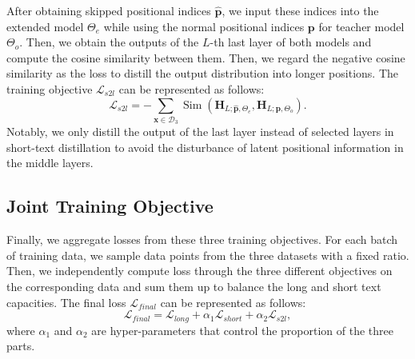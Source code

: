 After obtaining skipped positional indices $\hat{\bm {p}}$, we input these indices into the extended model $\Theta_e$ while using the normal positional indices $\bm p$ for teacher model $\Theta_o$. Then, we obtain the outputs of the $L$-th last layer of both models and compute the cosine similarity between them. Then, we regard the negative cosine similarity as the loss to distill the output distribution into longer positions. 
The training objective $\mathcal{L}_{s2l}$ can be represented as follows:
\begin{equation}
    \mathcal{L}_{s2l} = -\sum_{\bm{x}\in \mathcal D_3}  \operatorname{Sim}( \mathbf H_{L; \hat{\bm{p}}, \Theta_{e}}, \mathbf H_{L; \bm p,\Theta_{o}}).
\end{equation}
Notably, we only distill the output of the last layer instead of selected layers in short-text distillation to avoid the disturbance of latent positional information in the middle layers. 

\subsection{Joint Training Objective}

Finally,  we aggregate losses from these three training objectives. For each batch of training data, we sample data points from the three datasets with a fixed ratio. Then, we independently compute loss through the three different objectives on the corresponding data and sum them up to balance the long and short text capacities. The final loss $\mathcal{L}_{final}$ can be represented as follows:
\begin{equation}
    \mathcal{L}_{final} = \mathcal{L}_{long} + \alpha_1 \mathcal{L}_{short} + \alpha_2 \mathcal{L}_{s2l},
\end{equation}
where $\alpha_1$ and $\alpha_2$ are hyper-parameters that control the proportion of the three parts.